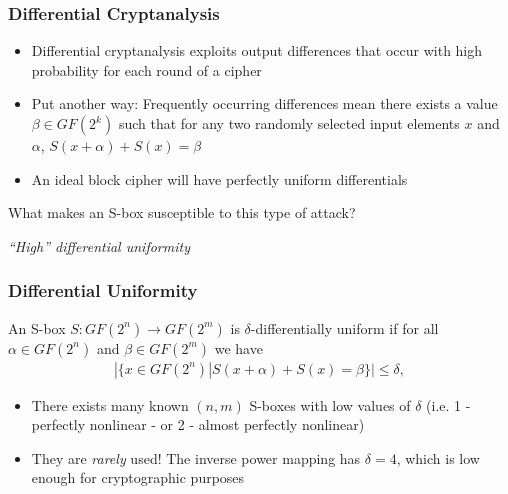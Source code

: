 \documentclass[10pt]{beamer}
\begin{document}

\begin{frame}
	\frametitle{Differential Cryptanalysis}
	\begin{itemize}
		\item Differential cryptanalysis exploits output differences that occur with high probability for each round of a cipher

		\pause 
		\item Put another way: Frequently occurring differences mean there exists a value $\beta \in GF(2^k)$ such that for any two randomly selected input elements $x$ and $\alpha$, $S(x + \alpha) + S(x) = \beta$

		\pause
		\item An ideal block cipher will have perfectly uniform differentials
	\end{itemize}

	\pause
	\medskip
	What makes an S-box susceptible to this type of attack?

	\pause 
	\medskip

	\begin{center}
		\emph{``High'' differential uniformity}
	\end{center}
\end{frame}

\begin{frame}
	\frametitle{Differential Uniformity}
	An S-box $S : GF(2^n) \to GF(2^m)$ is $\delta$-differentially uniform if for all $\alpha \in GF(2^n)$ and $\beta \in GF(2^m)$ we have
	\begin{align*}
		|\{x \in GF(2^n) | S(x + \alpha) + S(x) = \beta\}| \leq \delta, 
	\end{align*}

	\medskip
	\pause
	\begin{itemize}
		\item There exists many known $(n, m)$ S-boxes with low values of $\delta$ (i.e. 1 - perfectly nonlinear - or 2 - almost perfectly nonlinear)
		\pause
		\item They are \emph{rarely} used! The inverse power mapping has $\delta = 4$, which is low enough for cryptographic purposes
	\end{itemize}
\end{frame}
\end{document}
